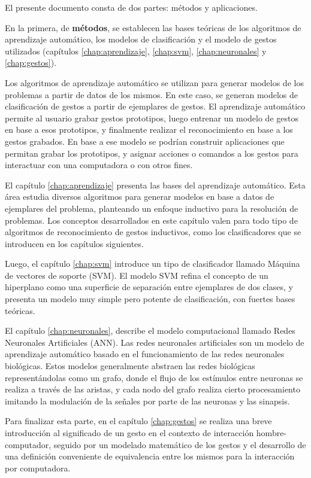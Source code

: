 El presente documento consta de dos partes: métodos y aplicaciones. 

En la primera, de \textbf{métodos}, se establecen las bases teóricas de los algoritmos de aprendizaje automático, los modelos de clasificación  y el modelo de gestos utilizados (capítulos \ref{chap:aprendizaje}, \ref{chap:svm}, \ref{chap:neuronales} y \ref{chap:gestos}). 

Los algoritmos de aprendizaje automático se utilizan para generar modelos de los problemas a partir de datos de los mismos. En este caso, se generan modelos de clasificación de gestos a partir de ejemplares de gestos. El aprendizaje automático permite al usuario grabar gestos prototipos, luego entrenar un modelo de gestos en base a esos prototipos, y finalmente realizar el reconocimiento en base a los gestos grabados. En base a ese modelo se podrían construir aplicaciones que permitan grabar los prototipos, y asignar acciones o comandos a los gestos para interactuar con una computadora o con otros fines. 

El capítulo \ref{chap:aprendizaje} presenta las bases del aprendizaje automático. Esta área estudia diversos algoritmos para generar modelos en base a datos de ejemplares del problema, planteando un enfoque inductivo para la resolución de problemas. Los conceptos desarrollados en este capítulo valen para todo tipo de algoritmos de reconocimiento de gestos inductivos, como los clasificadores que se introducen en los capítulos siguientes.

Luego, el capítulo \ref{chap:svm} introduce un tipo de clasificador llamado Máquina de vectores de soporte (SVM). El modelo SVM refina el concepto de un hiperplano como una superficie de separación entre ejemplares de dos clases, y presenta un modelo muy simple pero potente de clasificación, con fuertes bases teóricas.

El capítulo \ref{chap:neuronales}, describe el modelo computacional llamado Redes Neuronales Artificiales (ANN). Las redes neuronales artificiales son un modelo de aprendizaje automático basado en el funcionamiento de las redes neuronales biológicas. Estos modelos generalmente abstraen las redes biológicas representándolas como un grafo, donde el flujo de los estímulos entre neuronas se realiza a través de las aristas, y cada nodo del grafo realiza cierto procesamiento imitando la modulación de la señales por parte de las neuronas y las sinapsis.

Para finalizar esta parte, en el capítulo \ref{chap:gestos} se realiza una breve introducción al significado de un gesto en el contexto de interacción hombre-computador, seguido por un modelado matemático de los gestos y el desarrollo de una definición conveniente de equivalencia entre los mismos para la interacción por computadora.

